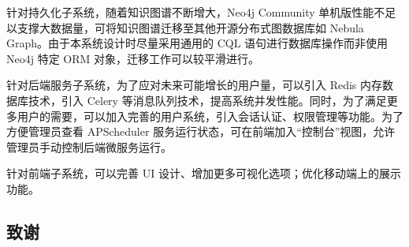 \documentclass[a4paper,AutoFakeBold,oneside,12pt]{book}
\begin{document}
针对持久化子系统，随着知识图谱不断增大，Neo4j Community 单机版性能不足以支撑大数据量，可将知识图谱迁移至其他开源分布式图数据库如 Nebula Graph。由于本系统设计时尽量采用通用的 CQL 语句进行数据库操作而非使用 Neo4j 特定 ORM 对象，迁移工作可以较平滑进行。

针对后端服务子系统，为了应对未来可能增长的用户量，可以引入 Redis 内存数据库技术，引入 Celery 等消息队列技术，提高系统并发性能。同时，为了满足更多用户的需要，可以加入完善的用户系统，引入会话认证、权限管理等功能。为了方便管理员查看 APScheduler 服务运行状态，可在前端加入``控制台''视图，允许管理员手动控制后端微服务运行。

针对前端子系统，可以完善 UI 设计、增加更多可视化选项；优化移动端上的展示功能。


\begin{nopagenumber}
	\clearpage{}
	

	\clearpage
	\chapter{致\qquad{}谢}
	\normalsize\thankwords

\end{nopagenumber}

% 


% 
\end{document}
